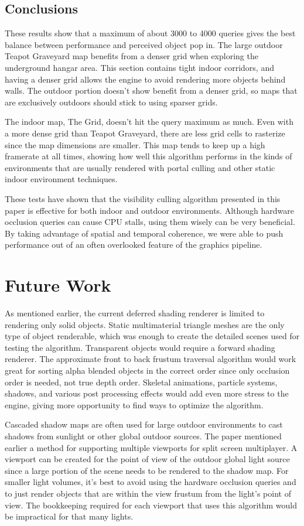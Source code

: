 \documentclass[12pt]{ucthesis}
\begin{document}
\section{Conclusions}
\label{conclusions}
These results show that a maximum of about 3000 to 4000 queries gives the best balance between performance and perceived object pop in.
The large outdoor Teapot Graveyard map benefits from a denser grid when exploring the underground hangar area.
This section contains tight indoor corridors, and having a denser grid allows the engine to avoid rendering more objects behind walls.
The outdoor portion doesn't show benefit from a denser grid, so maps that are exclusively outdoors should stick to using sparser grids.

The indoor map, The Grid, doesn't hit the query maximum as much.
Even with a more dense grid than Teapot Graveyard, there are less grid cells to rasterize since the map dimensions are smaller.
This map tends to keep up a high framerate at all times, showing how well this algorithm performs in the kinds of environments that are usually rendered with portal culling and other static indoor environment techniques.

These tests have shown that the visibility culling algorithm presented in this paper is effective for both indoor and outdoor environments.
Although hardware occlusion queries can cause CPU stalls, using them wisely can be very beneficial.
By taking advantage of spatial and temporal coherence, we were able to push performance out of an often overlooked feature of the graphics pipeline.

\chapter{Future Work}
\label{future-work}
As mentioned earlier, the current deferred shading renderer is limited to rendering only solid objects.
Static multimaterial triangle meshes are the only type of object renderable, which was enough to create the detailed scenes used for testing the algorithm.
Transparent objects would require a forward shading renderer.
The approximate front to back frustum traversal algorithm would work great for sorting alpha blended objects in the correct order since only occlusion order is needed, not true depth order.
Skeletal animations, particle systems, shadows, and various post processing effects would add even more stress to the engine, giving more opportunity to find ways to optimize the algorithm.

Cascaded shadow maps are often used for large outdoor environments to cast shadows from sunlight or other global outdoor sources.\cite{ms-cascaded-shadow}
The paper mentioned earlier a method for supporting multiple viewports for split screen multiplayer.
A viewport can be created for the point of view of the outdoor global light source since a large portion of the scene needs to be rendered to the shadow map.
For smaller light volumes, it's best to avoid using the hardware occlusion queries and to just render objects that are within the view frustum from the light's point of view.
The bookkeeping required for each viewport that uses this algorithm would be impractical for that many lights.
\end{document}
